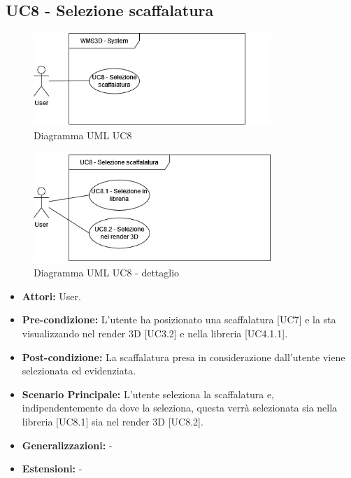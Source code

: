 \subsection{UC8 - Selezione scaffalatura}
\begin{figure}[H]
  \centering
  \includegraphics[width=0.8\textwidth]{UC_diagrams_1-10/UC8_sys.drawio.png}
   \caption{Diagramma UML UC8}
\end{figure}
\begin{figure}[H]
  \centering
  \includegraphics[width=0.8\textwidth]{UC_diagrams_1-10/UC8.drawio.png}
   \caption{Diagramma UML UC8 - dettaglio}
\end{figure}
\begin{itemize}
    \item \textbf{Attori:} User.
    \item \textbf{Pre-condizione:}  L'utente ha posizionato una scaffalatura [UC7] e la sta visualizzando nel render 3D [UC3.2] e nella libreria [UC4.1.1].
    \item \textbf{Post-condizione:} La scaffalatura presa in considerazione dall'utente viene selezionata ed evidenziata.
    \item \textbf{Scenario Principale:} L'utente seleziona la scaffalatura e, indipendentemente da dove la seleziona, questa verrà selezionata sia nella libreria [UC8.1] sia nel render 3D [UC8.2].
    \item \textbf{Generalizzazioni:} -
    \item \textbf{Estensioni:} -
\end{itemize}


